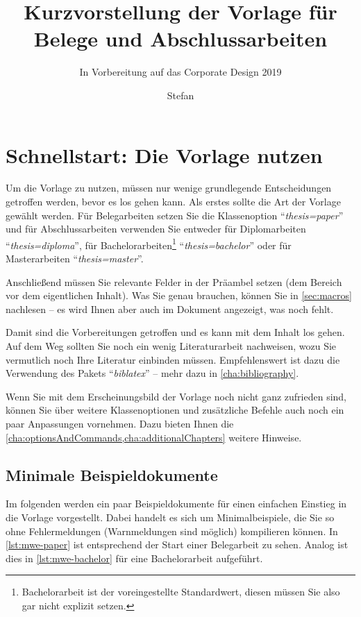 \documentclass[
%
	thesis=paper,		%
	compactlistof,		%
	noauthorship,		%
%
	fancy,				%
%
%
]{hsmw-thesis}
\title{Kurzvorstellung der Vorlage für Belege und Abschlussarbeiten}%
\author{Stefan}{Schildbach}[M.Sc.]%
\subtitle{In Vorbereitung auf das Corporate Design 2019}%
\begin{document}
	\chapter{Schnellstart: Die Vorlage nutzen}
	
	Um die Vorlage zu nutzen, müssen nur wenige grundlegende Entscheidungen getroffen werden, bevor es los gehen kann.
	Als erstes sollte die Art der Vorlage gewählt werden.
	Für Belegarbeiten setzen Sie die Klassenoption \enquote{\textit{thesis=paper}} und für Abschlussarbeiten verwenden Sie entweder für Diplomarbeiten \enquote{\textit{thesis=diploma}}, für Bachelorarbeiten\footnote{Bachelorarbeit ist der voreingestellte Standardwert, diesen müssen Sie also gar nicht explizit setzen.} \enquote{\textit{thesis=bachelor}} oder für Masterarbeiten \enquote{\textit{thesis=master}}.
	
	Anschließend müssen Sie relevante Felder in der Präambel setzen (dem Bereich vor dem eigentlichen Inhalt).
	Was Sie genau brauchen, können Sie in \cref{sec:macros} nachlesen -- es wird Ihnen aber auch im Dokument angezeigt, was noch fehlt.
	
	Damit sind die Vorbereitungen getroffen und es kann mit dem Inhalt los gehen.
	Auf dem Weg sollten Sie noch ein wenig Literaturarbeit nachweisen, wozu Sie vermutlich noch Ihre Literatur einbinden müssen.
	Empfehlenswert ist dazu die Verwendung des Pakets \enquote{\textit{biblatex}} -- mehr dazu in \cref{cha:bibliography}.
	
	Wenn Sie mit dem Erscheinungsbild der Vorlage noch nicht ganz zufrieden sind, können Sie über weitere Klassenoptionen und zusätzliche Befehle auch noch ein paar Anpassungen vornehmen.
	Dazu bieten Ihnen die \cref{cha:optionsAndCommands,cha:additionalChapters} weitere Hinweise.
	
	\section{Minimale Beispieldokumente}
	
	Im folgenden werden ein paar Beispieldokumente für einen einfachen Einstieg in die Vorlage vorgestellt.
	Dabei handelt es sich um Minimalbeispiele, die Sie so ohne Fehlermeldungen (Warnmeldungen sind möglich) kompilieren können.
	In \cref{lst:mwe-paper} ist entsprechend der Start einer Belegarbeit zu sehen.
	Analog ist dies in \cref{lst:mwe-bachelor} für eine Bachelorarbeit aufgeführt.
	
	
	
\end{document}
